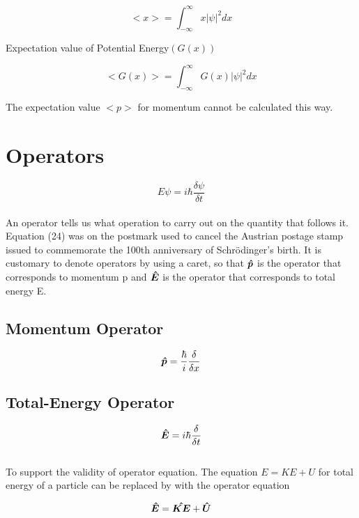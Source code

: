 \documentclass{article}
\begin{document}
\begin{equation}
    <x>=\int_{-\infty}^{\infty} x|\psi|^2dx 
\end{equation}

Expectation value of Potential Energy$(G(x))$

\begin{equation}
    <G(x)>=\int_{-\infty}^{\infty}G(x)|\psi|^2dx 
\end{equation}

The expectation value $<p>$ for momentum cannot be calculated this way.

\section{Operators}
\begin{equation}
    E\psi=i\hbar\frac{\delta\psi}{\delta t}
\end{equation}
\\
An operator tells us what operation to carry out on the quantity that follows it.
\\
Equation (24) was on the postmark
used to cancel the Austrian postage stamp issued to commemorate the 100th
anniversary of Schrödinger’s birth.
It is customary to denote operators by using a caret, so that $\vu*{p}$ is the operator that
corresponds to momentum p and $\vu*{E}$ is the operator that corresponds to total energy E.

\subsection*{Momentum Operator}
\begin{equation}
    \vu*{p}=\frac{\hbar}{i}\frac{\delta}{\delta x}
\end{equation}

\subsection*{Total-Energy Operator}
\begin{equation}
    \vu*{E}=i\hbar\frac{\delta}{\delta t}
\end{equation} \vspace*{20pt}
\\
To support the validity of operator equation. The equation $E=KE+U$ for total energy of a particle can be replaced by with the operator equation

\begin{equation}
    \vu*{E}=\vu*{KE}+\vu*{U}
\end{equation}
\end{document}
